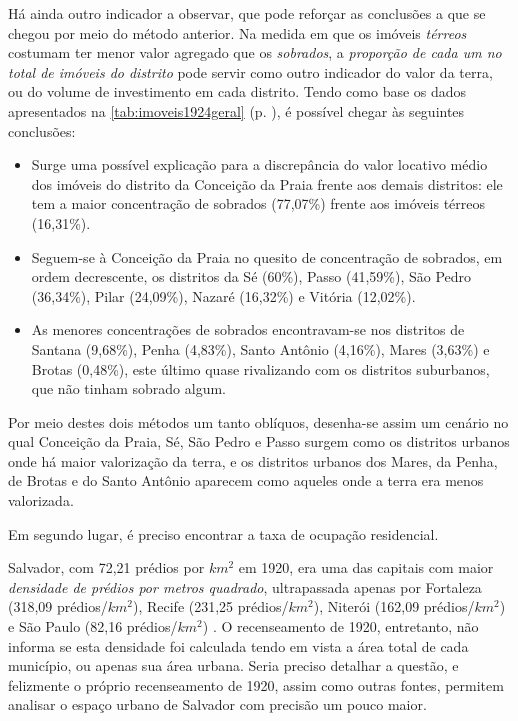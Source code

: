 Há ainda outro indicador a observar, que pode reforçar as conclusões a que se chegou por meio do método anterior. Na medida em que os imóveis \textit{térreos} costumam ter menor valor agregado que os \textit{sobrados}, a \textit{proporção de cada um no total de imóveis do distrito} pode servir como outro indicador do valor da terra, ou do volume de investimento em cada distrito. Tendo como base os dados apresentados na \autoref{tab:imoveis1924geral} (p. \pageref{tab:imoveis1924geral}), é possível chegar às seguintes conclusões:

\begin{itemize}
\item Surge uma possível explicação para a discrepância do valor locativo médio dos imóveis do distrito da Conceição da Praia frente aos demais distritos: ele tem a maior concentração de sobrados (77,07\%) frente aos imóveis térreos (16,31\%).
\item Seguem-se à Conceição da Praia no quesito de concentração de sobrados, em ordem decrescente, os distritos da Sé (60\%), Passo (41,59\%), São Pedro (36,34\%), Pilar (24,09\%), Nazaré (16,32\%) e Vitória (12,02\%).
\item As menores concentrações de sobrados encontravam-se nos distritos de Santana (9,68\%), Penha (4,83\%), Santo Antônio (4,16\%), Mares (3,63\%) e Brotas (0,48\%), este último quase rivalizando com os distritos suburbanos, que não tinham sobrado algum.
\end{itemize}

Por meio destes dois métodos um tanto oblíquos, desenha-se assim um cenário no qual Conceição da Praia, Sé, São Pedro e Passo surgem como os distritos urbanos onde há maior valorização da terra, e os distritos urbanos dos Mares, da Penha, de Brotas e do Santo Antônio aparecem como aqueles onde a terra era menos valorizada.

Em segundo lugar, é preciso encontrar a taxa de ocupação residencial.

Salvador, com 72,21 prédios por $km^{2}$ em 1920, era uma das capitais com maior \textit{densidade de prédios por metros quadrado}, ultrapassada apenas por Fortaleza (318,09 prédios/$km^{2}$), Recife (231,25 prédios/$km^{2}$), Niterói (162,09 prédios/$km^{2}$) e São Paulo (82,16 prédios/$km^{2}$) \cite[p.~XV]{brasil_censo46_1920}. O recenseamento de 1920, entretanto, não informa se esta densidade foi calculada tendo em vista a área total de cada município, ou apenas sua área urbana. Seria preciso detalhar a questão, e felizmente o próprio recenseamento de 1920, assim como outras fontes, permitem analisar o espaço urbano de Salvador com precisão um pouco maior.

